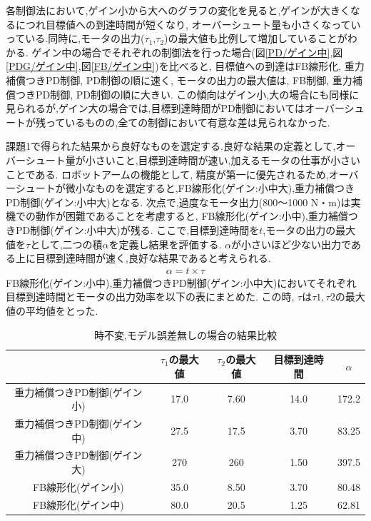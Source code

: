 \documentclass[a4paper,11pt,titlepage]{jsarticle}
\begin{document}
各制御法において,ゲイン小から大へのグラフの変化を見ると,ゲインが大きくなるにつれ目標値への到達時間が短くなり,
オーバーシュート量も小さくなっていっている.同時に,モータの出力($\tau_1$,$\tau_2$)の最大値も比例して増加していることがわかる.
ゲイン中の場合でそれぞれの制御法を行った場合(図\ref{PD/ゲイン中},図\ref{PDG/ゲイン中},図\ref{FB/ゲイン中})を比べると,
目標値への到達はFB線形化, 重力補償つきPD制御, PD制御の順に速く, モータの出力の最大値は, FB制御, 重力補償つきPD制御, PD制御の順に大きい.
この傾向はゲイン小,大の場合にも同様に見られるが,ゲイン大の場合では,目標到達時間がPD制御においてはオーバーシュートが残っているものの,全ての制御において有意な差は見られなかった.
\par
課題1で得られた結果から良好なものを選定する.良好な結果の定義として,オーバーシュート量が小さいこと,目標到達時間が速い,加えるモータの仕事が小さいことである.
ロボットアームの機能として, 精度が第一に優先されるため,オーバーシュートが微小なものを選定すると,FB線形化(ゲイン:小中大),重力補償つきPD制御(ゲイン:小中大)となる.
次点で,過度なモータ出力(800〜1000 N・m)は実機での動作が困難であることを考慮すると, FB線形化(ゲイン:小中),重力補償つきPD制御(ゲイン:小中大)が残る.
ここで,目標到達時間を$t$,モータの出力の最大値を$\tau$として,二つの積$\alpha$を定義し結果を評価する.
$\alpha$が小さいほど少ない出力である上に目標到達時間が速く,良好な結果であると考えられる.
\begin{align}
  \alpha = t\times\tau
\end{align}
FB線形化(ゲイン:小中),重力補償つきPD制御(ゲイン:小中大)においてそれぞれ目標到達時間とモータの出力効率を以下の表にまとめた.
この時, $\tau$は$\tau1,\tau2$の最大値の平均値をとった.
\begin{table}[H]
	\caption{時不変,モデル誤差無しの場合の結果比較}
	\label{時不変,モデル誤差無しの場合の結果比較}
	\begin{center}
		\begin{tabular}{c|c|c|c|c}\hline
		   & $\tau_1$の最大値 & $\tau_2$の最大値 & 目標到達時間 & $\alpha$ \\ \hline
			重力補償つきPD制御(ゲイン小) & 17.0 & 7.60 & 14.0 & 172.2\\ \hline
			重力補償つきPD制御(ゲイン中) & 27.5 & 17.5 & 3.70 &  83.25\\ \hline
      重力補償つきPD制御(ゲイン大) & 270 & 260 & 1.50 & 397.5 \\ \hline
      FB線形化(ゲイン小) & 35.0 & 8.50 & 3.70 & 80.48 \\ \hline
      FB線形化(ゲイン中) & 80.0 & 20.5 & 1.25 & 62.81 \\ \hline
	   \end{tabular}
\end{center}
\end{table}
\end{document}
